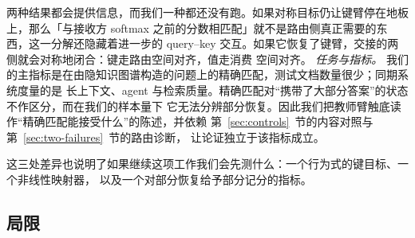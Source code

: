 \documentclass[11pt]{article}
\begin{document}
两种结果都会提供信息，而我们一种都还没有跑。如果对称目标仍让键臂停在地板上，那么「与接收方
softmax 之前的分数相匹配」就不是路由侧真正需要的东西，这一分解还隐藏着进一步的
query--key 交互。如果它恢复了键臂，交接的两侧就会对称地闭合：键走路由空间对齐，值走消费
空间对齐。
\emph{任务与指标。}
我们的主指标是在由隐知识图谱构造的问题上的精确匹配，测试文档数量很少；同期系统度量的是
长上下文、agent 与检索质量。精确匹配对“携带了大部分答案”的状态不作区分，而在我们的样本量下
它无法分辨部分恢复。因此我们把教师臂触底读作“精确匹配能接受什么”的陈述，并依赖
第~\ref{sec:controls}~节的内容对照与第~\ref{sec:two-failures}~节的路由诊断，
让论证独立于该指标成立。

这三处差异也说明了如果继续这项工作我们会先测什么：一个行为式的键目标、一个非线性映射器，
以及一个对部分恢复给予部分记分的指标。

\subsection{局限}
\label{sec:limitations}
\end{document}
